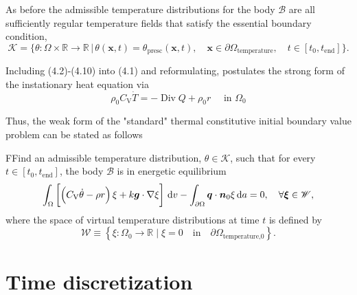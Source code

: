 As before the admissible temperature distributions for the body \(\mathcal B\) are all sufficiently regular temperature fields that satisfy the essential boundary condition,
\begin{equation}
  \mathscr K = \{\theta:\Omega \times \mathbb R \to \mathbb R\,|\,\theta(\bm x, t) = \theta_\text{presc}(\bm x, t),\quad \bm x\in \partial \Omega_\text{temperature},\quad t\in[t_0, t_\text{end}]\}.
\end{equation}

Including (4.2)-(4.10) into (4.1) and reformulating, postulates the strong form of the instationary heat equation via
\[
\rho_{0} C_{\mathrm{V}} \dot{T}=-\operatorname{Div} Q+\rho_{0} r \quad \text { in } \Omega_{0}
\]

Thus, the weak form of the "standard" thermal constitutive initial boundary value problem can be stated as follows
 \begin{problem}
     FFind an admissible temperature distribution, $\theta \in \mathscr{K}$, such that for every $t\in [t_0,t_\text{end}]$, the body $\mathscr{B}$ is in energetic equilibrium
         \begin{equation}
         \int_\Omega   \left[\left(C_\mathrm{V} \dot \theta - \rho r\right) \xi +k\bm g\cdot \nabla \xi\right]\,\mathrm{d} v - \int_{\partial\Omega} \bm q\cdot \bm n_0 \xi\,\mathrm{d} a = 0,\quad \forall \bm{\xi} \in \mathscr{W},
     \end{equation}
     where the space of virtual temperature distributions at time $t$ is defined by
     \begin{equation}
         \mathscr{W} \equiv \left\{\xi:\Omega_0\to \mathbb R\;|\;\xi = 0\quad \text{in}\quad \partial\Omega_\text{temperature,0}\right\}.
     \end{equation}
 \end{problem}

\section{Time discretization}


